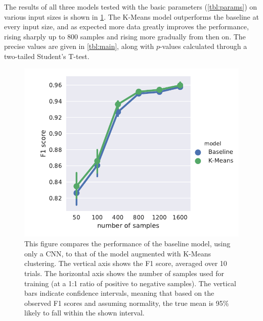 The results of all three models tested with the basic parameters
(\cref{tbl:params}) on various input sizes is shown in \cref{fig:result}. The
K-Means model outperforms the baseline at every input size, and as expected more
data greatly improves the performance, rising sharply up to 800 samples and
rising more gradually from then on. The precise values are given in
\cref{tbl:main}, along with $p$-values calculated through a two-tailed Student's
T-test.
\begin{figure}[tb]
  \centering
  \includegraphics[width=\textwidth]{figures/results/main/factorplot_f1_hue.pdf}
  \caption{This figure compares the performance of the baseline model, using
    only a CNN, to that of the model augmented with K-Means clustering. The
    vertical axis shows the F1 score, averaged over 10 trials. The horizontal
    axis shows the number of samples used for training (at a 1:1 ratio of
    positive to negative samples). The vertical bars indicate confidence
    intervals, meaning that based on the observed F1 scores and assuming
    normality, the true mean is 95\% likely to fall within the shown
    interval.\label{fig:result}}
\end{figure}

